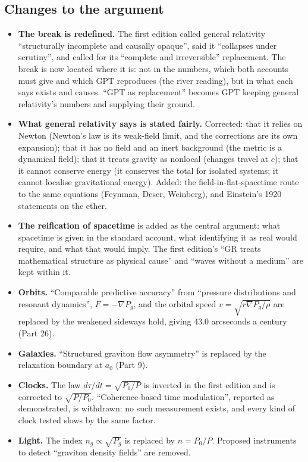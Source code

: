 \subsection*{Changes to the argument}
\begin{itemize}
\item \textbf{The break is redefined.} The first edition called general relativity ``structurally incomplete and causally opaque'', said it ``collapses under scrutiny'', and called for its ``complete and irreversible'' replacement. The break is now located where it is: not in the numbers, which both accounts must give and which GPT reproduces (the river reading), but in what each says exists and causes. ``GPT as replacement'' becomes GPT keeping general relativity's numbers and supplying their ground.
\item \textbf{What general relativity says is stated fairly.} Corrected: that it relies on Newton (Newton's law is its weak-field limit, and the corrections are its own expansion); that it has no field and an inert background (the metric is a dynamical field); that it treats gravity as nonlocal (changes travel at $c$); that it cannot conserve energy (it conserves the total for isolated systems; it cannot localise gravitational energy). Added: the field-in-flat-spacetime route to the same equations (Feynman, Deser, Weinberg), and Einstein's 1920 statements on the ether.
\item \textbf{The reification of spacetime} is added as the central argument: what spacetime is given in the standard account, what identifying it as real would require, and what that would imply. The first edition's ``GR treats mathematical structure as physical cause'' and ``waves without a medium'' are kept within it.
\item \textbf{Orbits.} ``Comparable predictive accuracy'' from ``pressure distributions and resonant dynamics'', $F = -\nabla P_g$, and the orbital speed $v = \sqrt{r\nabla P_g/\rho}$ are replaced by the weakened sideways hold, giving 43.0 arcseconds a century (Part 26).
\item \textbf{Galaxies.} ``Structured graviton flow asymmetry'' is replaced by the relaxation boundary at $a_0$ (Part 9).
\item \textbf{Clocks.} The law $d\tau/dt = \sqrt{P_0/P}$ is inverted in the first edition and is corrected to $\sqrt{P/P_0}$. ``Coherence-based time modulation'', reported as demonstrated, is withdrawn: no such measurement exists, and every kind of clock tested slows by the same factor.
\item \textbf{Light.} The index $n_g \propto \sqrt{P_g}$ is replaced by $n = P_0/P$. Proposed instruments to detect ``graviton density fields'' are removed.

\end{itemize}
